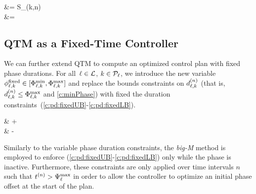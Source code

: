 \begin{cAlign} 
%
 &= S_{\ell}(k,n)\\
%
%
 &= 
%
\end{cAlign}



\subsection{QTM as a Fixed-Time Controller}

We can further extend QTM to compute an optimized control plan with fixed phase
durations.
%
For all~$\tl \in \Lset$, $k \in \Pset_\tl$, we introduce the new variable
$\PTFIXED{\ell}{k} \in [\PTMIN{\ell}{k}, \PTMAX{\ell}{k}]$ and replace the
bounds constraints on $\pd[n]{\ell}{k}$ (that is, $\pd[n]{\ell}{k} \le
\PTMAX{\ell}{k}$ and \ref{c:minPhase}) with fixed the duration
constraints~(\ref{c:pd:fixedUB}-\ref{c:pd:fixedLB}).
%
\begin{cAlign}  &\le {} + 
   \\
%
   &\ge {} -  
   \end{cAlign}


Similarly to the variable phase duration constraints, the \textit{big-M} method
is employed to enforce (\ref{c:pd:fixedUB}-\ref{c:pd:fixedLB}) only while the
phase is inactive.
%
Furthermore, these constraints are only applied over time intervals $n$ such
that $\tn[n] > \CTMAX{\tl}$ in order to allow the controller to optimize an
initial phase offset at the start of the plan.



